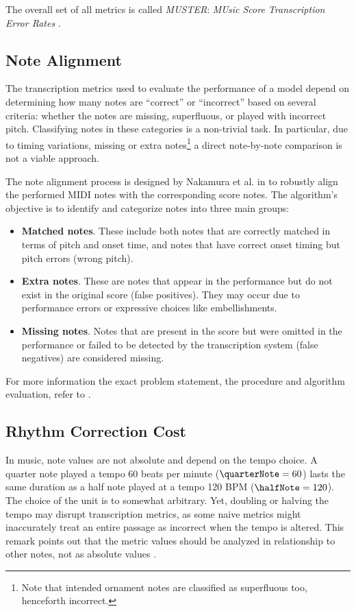 The overall set of all metrics is called \emph{MUSTER}: \emph{MUsic Score Transcription Error Rates} \cite{Hiramatsu2021}.

\subsection{Note Alignment}

The transcription metrics used to evaluate the performance of a model depend on determining how many notes are ``correct'' or ``incorrect'' based on several criteria: whether the notes are missing, superfluous, or played with incorrect pitch. Classifying notes in these categories is a non-trivial task. In particular, due to timing variations, missing or extra notes\footnote{Note that intended ornament notes are classified as superfluous too, henceforth incorrect.} a direct note-by-note comparison is not a viable approach.

The note alignment process is designed by Nakamura et al. in \cite{Nakamura2017b} to robustly align the performed MIDI notes with the corresponding score notes. The algorithm's objective is to identify and categorize notes into three main groups: \begin{itemize}
	\item {\bf Matched notes}. These include both notes that are correctly matched in terms of pitch and onset time, and notes that have correct onset timing but pitch errors (wrong pitch).
	\item {\bf Extra notes}. These are notes that appear in the performance but do not exist in the original score (false positives). They may occur due to performance errors or expressive choices like embellishments.
	\item {\bf Missing notes}. Notes that are present in the score but were omitted in the performance or failed to be detected by the transcription system (false negatives) are considered missing.
\end{itemize}

For more information the exact problem statement, the procedure and algorithm evaluation, refer to \cite{Nakamura2017b}.

\subsection{Rhythm Correction Cost}

In music, note values are not absolute and depend on the tempo choice. A quarter note played a tempo $60$ beats per minute ($\quarterNote = 60$) lasts the same duration as a half note played at a tempo 120 BPM ($\halfNote = 120$). The choice of the unit is to somewhat arbitrary. Yet, doubling or halving the tempo may disrupt transcription metrics, as some naive metrics might inaccurately treat an entire passage as incorrect when the tempo is altered. This remark points out that the metric values should be analyzed in relationship to other notes, not as absolute values \cite[p. 7]{Nakamura2017c}.

